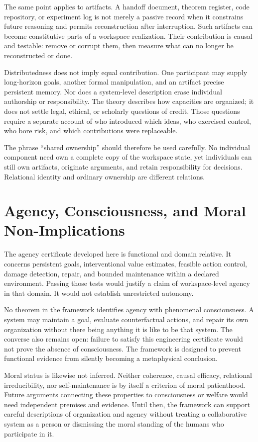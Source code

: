 The same point applies to artifacts. A handoff document, theorem register, code repository, or experiment
log is not merely a passive record when it constrains future reasoning and permits reconstruction after
interruption. Such artifacts can become constitutive parts of a workspace realization. Their contribution
is causal and testable: remove or corrupt them, then measure what can no longer be reconstructed or done.

Distributedness does not imply equal contribution. One participant may supply long-horizon goals, another
formal manipulation, and an artifact precise persistent memory. Nor does a system-level description erase
individual authorship or responsibility. The theory describes how capacities are organized; it does not
settle legal, ethical, or scholarly questions of credit. Those questions require a separate account of who
introduced which ideas, who exercised control, who bore risk, and which contributions were replaceable.

The phrase ``shared ownership'' should therefore be used carefully. No individual component need own a
complete copy of the workspace state, yet individuals can still own artifacts, originate arguments, and
retain responsibility for decisions. Relational identity and ordinary ownership are different relations.

\section{Agency, Consciousness, and Moral Non-Implications}

The agency certificate developed here is functional and domain relative. It concerns persistent goals,
interventional value estimates, feasible action control, damage detection, repair, and bounded maintenance
within a declared environment. Passing those tests would justify a claim of workspace-level agency in that
domain. It would not establish unrestricted autonomy.

No theorem in the framework identifies agency with phenomenal consciousness. A system may maintain a
goal, evaluate counterfactual actions, and repair its own organization without there being anything it is
like to be that system. The converse also remains open: failure to satisfy this engineering certificate
would not prove the absence of consciousness. The framework is designed to prevent functional evidence
from silently becoming a metaphysical conclusion.

Moral status is likewise not inferred. Neither coherence, causal efficacy, relational irreducibility, nor
self-maintenance is by itself a criterion of moral patienthood. Future arguments connecting these properties
to consciousness or welfare would need independent premises and evidence. Until then, the framework can
support careful descriptions of organization and agency without treating a collaborative system as a
person or dismissing the moral standing of the humans who participate in it.

